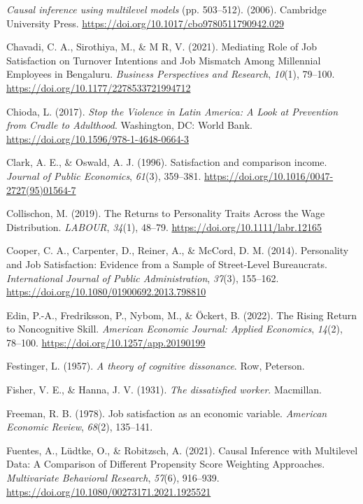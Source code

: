\documentclass[
]{interact}
\newlength{\cslhangindent}
\newenvironment{CSLReferences}[2] %
 {\begin{list}{}{%
  \setlength{\itemindent}{0pt}
  \setlength{\leftmargin}{0pt}
  \setlength{\parsep}{0pt}
  \ifodd #1
   \setlength{\leftmargin}{\cslhangindent}
   \setlength{\itemindent}{-1\cslhangindent}
  \fi
  \setlength{\itemsep}{#2\baselineskip}}}
 {\end{list}}
\begin{document}
\begin{CSLReferences}{1}{0}
\emph{Causal inference using multilevel models} (pp. 503--512). (2006).
Cambridge University Press.
\url{https://doi.org/10.1017/cbo9780511790942.029}

Chavadi, C. A., Sirothiya, M., \& M R, V. (2021). Mediating Role of Job
Satisfaction on Turnover Intentions and Job Mismatch Among Millennial
Employees in Bengaluru. \emph{Business Perspectives and Research},
\emph{10}(1), 79--100. \url{https://doi.org/10.1177/2278533721994712}

Chioda, L. (2017). \emph{Stop the Violence in Latin America: A Look at
Prevention from Cradle to Adulthood}. Washington, DC: World Bank.
\url{https://doi.org/10.1596/978-1-4648-0664-3}

Clark, A. E., \& Oswald, A. J. (1996). Satisfaction and comparison
income. \emph{Journal of Public Economics}, \emph{61}(3), 359--381.
\url{https://doi.org/10.1016/0047-2727(95)01564-7}

Collischon, M. (2019). The Returns to Personality Traits Across the Wage
Distribution. \emph{LABOUR}, \emph{34}(1), 48--79.
\url{https://doi.org/10.1111/labr.12165}

Cooper, C. A., Carpenter, D., Reiner, A., \& McCord, D. M. (2014).
Personality and Job Satisfaction: Evidence from a Sample of Street-Level
Bureaucrats. \emph{International Journal of Public Administration},
\emph{37}(3), 155--162.
\url{https://doi.org/10.1080/01900692.2013.798810}

Edin, P.-A., Fredriksson, P., Nybom, M., \& Öckert, B. (2022). The
Rising Return to Noncognitive Skill. \emph{American Economic Journal:
Applied Economics}, \emph{14}(2), 78--100.
\url{https://doi.org/10.1257/app.20190199}

Festinger, L. (1957). \emph{A theory of cognitive dissonance}. Row,
Peterson.

Fisher, V. E., \& Hanna, J. V. (1931). \emph{The dissatisfied worker}.
Macmillan.

Freeman, R. B. (1978). Job satisfaction as an economic variable.
\emph{American Economic Review}, \emph{68}(2), 135--141.

Fuentes, A., Lüdtke, O., \& Robitzsch, A. (2021). Causal Inference with
Multilevel Data: A Comparison of Different Propensity Score Weighting
Approaches. \emph{Multivariate Behavioral Research}, \emph{57}(6),
916--939. \url{https://doi.org/10.1080/00273171.2021.1925521}


\end{CSLReferences}
\end{document}
